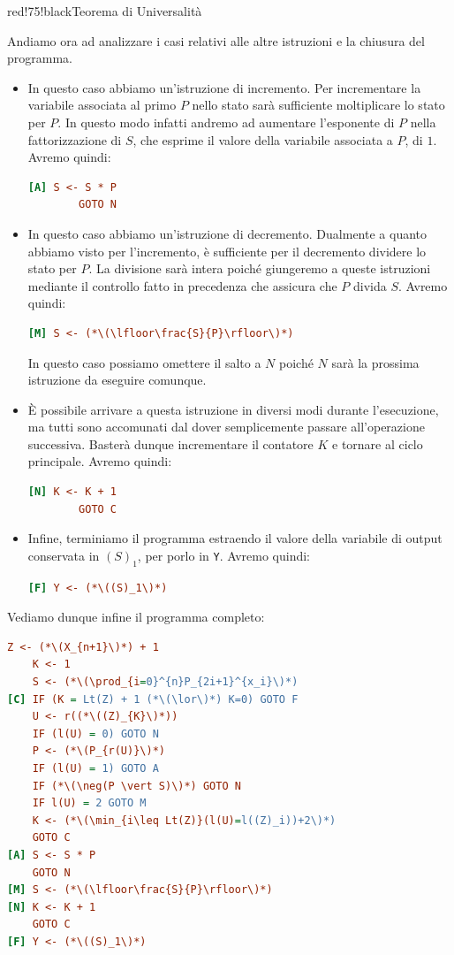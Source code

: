 \begin{halfframedbox}{red!75!black}{Teorema di Universalità}

  Andiamo ora ad analizzare i casi relativi alle altre istruzioni e la chiusura del programma.
  \begin{itemize}
    \item[A] In questo caso abbiamo un'istruzione di incremento. Per incrementare la variabile associata al primo \(P\) nello stato sarà sufficiente moltiplicare lo stato per \(P\). In questo modo infatti andremo ad aumentare l'esponente di \(P\) nella fattorizzazione di \(S\), che esprime il valore della variabile associata a \(P\), di \(1\). Avremo quindi:
    \begin{lstlisting}[language=ini, caption={ }]
    [A] S <- S * P
        GOTO N
    \end{lstlisting}
    \item[M] In questo caso abbiamo un'istruzione di decremento. Dualmente a quanto abbiamo visto per l'incremento, è sufficiente per il decremento dividere lo stato per \(P\). La divisione sarà intera poiché giungeremo a queste istruzioni mediante il controllo fatto in precedenza che assicura che \(P\) divida \(S\). Avremo quindi:
    \begin{lstlisting}[language=ini, caption={ }]
    [M] S <- (*\(\lfloor\frac{S}{P}\rfloor\)*)
    \end{lstlisting}
    In questo caso possiamo omettere il salto a \(N\) poiché \(N\) sarà la prossima istruzione da eseguire comunque.
    \item[N] È possibile arrivare a questa istruzione in diversi modi durante l'esecuzione, ma tutti sono accomunati dal dover semplicemente passare all'operazione successiva. Basterà dunque incrementare il contatore \(K\) e tornare al ciclo principale. Avremo quindi:
    \begin{lstlisting}[language=ini, caption={ }]
    [N] K <- K + 1
        GOTO C
    \end{lstlisting}
    \item[F] Infine, terminiamo il programma estraendo il valore della variabile di output conservata in \({(S)}_1\), per porlo in \lstinline{Y}. Avremo quindi:
    \begin{lstlisting}[language=ini, caption={ }]
    [F] Y <- (*\((S)_1\)*)
    \end{lstlisting}
  \end{itemize}

  Vediamo dunque infine il programma completo:
  \begin{lstlisting}[language=ini, caption=Dimostrazione Programma Universale]
    Z <- (*\(X_{n+1}\)*) + 1
    K <- 1
    S <- (*\(\prod_{i=0}^{n}P_{2i+1}^{x_i}\)*)
[C] IF (K = Lt(Z) + 1 (*\(\lor\)*) K=0) GOTO F
    U <- r((*\((Z)_{K}\)*))
    IF (l(U) = 0) GOTO N
    P <- (*\(P_{r(U)}\)*)
    IF (l(U) = 1) GOTO A
    IF (*\(\neg(P \vert S)\)*) GOTO N
    IF l(U) = 2 GOTO M
    K <- (*\(\min_{i\leq Lt(Z)}(l(U)=l((Z)_i))+2\)*)
    GOTO C
[A] S <- S * P
    GOTO N
[M] S <- (*\(\lfloor\frac{S}{P}\rfloor\)*)
[N] K <- K + 1
    GOTO C
[F] Y <- (*\((S)_1\)*)
\end{lstlisting}

\end{halfframedbox}

